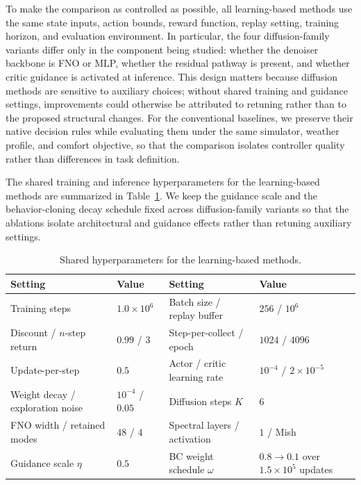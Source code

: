 \documentclass[lettersize,journal]{IEEEtran}
\theoremstyle{nonumberplain}     \theoremheaderfont{\bfseries\itshape}     \theorembodyfont{\normalfont}     \theoremseparator{:}     \theoremsymbol{\ensuremath{\blacksquare}}     \newtheorem{proof}{Proof}
\theoremstyle{plain}     \theoremheaderfont{\bfseries\itshape}     \theorembodyfont{\normalfont}     \theoremseparator{:}     \theoremsymbol{\ensuremath{\blacksquare}}     \newtheorem{remark}{Remark}
\begin{document}
To make the comparison as controlled as possible, all learning-based methods use the same state inputs, action bounds, reward function, replay setting, training horizon, and evaluation environment. In particular, the four diffusion-family variants differ only in the component being studied: whether the denoiser backbone is FNO or MLP, whether the residual pathway is present, and whether critic guidance is activated at inference. This design matters because diffusion methods are sensitive to auxiliary choices; without shared training and guidance settings, improvements could otherwise be attributed to retuning rather than to the proposed structural changes. For the conventional baselines, we preserve their native decision rules while evaluating them under the same simulator, weather profile, and comfort objective, so that the comparison isolates controller quality rather than differences in task definition.

The shared training and inference hyperparameters for the learning-based methods are summarized in Table~\ref{tab:training_setup}. We keep the guidance scale and the behavior-cloning decay schedule fixed across diffusion-family variants so that the ablations isolate architectural and guidance effects rather than retuning auxiliary settings.

\begin{table}[t]
\centering
\caption{Shared hyperparameters for the learning-based methods.}
\label{tab:training_setup}
\scriptsize
\setlength{\tabcolsep}{5pt}
\renewcommand{\arraystretch}{1.05}
\begin{tabular}{
>{\raggedright\arraybackslash}p{}
>{\raggedright\arraybackslash}p{}
>{\raggedright\arraybackslash}p{}
>{\raggedright\arraybackslash}p{}}
\toprule
Setting & Value & Setting & Value \\
\midrule
Training steps & $1.0\times 10^6$ & Batch size / replay buffer & $256$ / $10^6$ \\
Discount / $n$-step return & $0.99$ / $3$ & Step-per-collect / epoch & $1024$ / $4096$ \\
Update-per-step & $0.5$ & Actor / critic learning rate & $10^{-4}$ / $2\times 10^{-5}$ \\
Weight decay / exploration noise & $10^{-4}$ / $0.05$ & Diffusion steps $K$ & $6$ \\
FNO width / retained modes & $48$ / $4$ & Spectral layers / activation & $1$ / Mish \\
Guidance scale $\eta$ & $0.5$ & BC weight schedule $\omega$ & $0.8 \rightarrow 0.1$ over $1.5\times 10^5$ updates \\
\bottomrule
\end{tabular}
\end{table}
\end{document}

